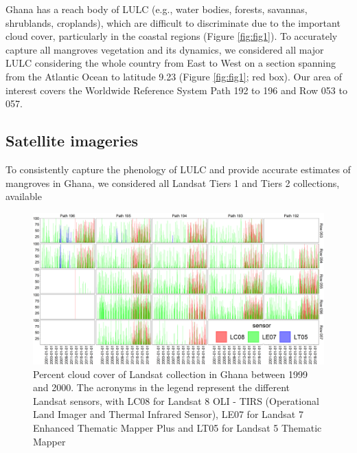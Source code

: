 \documentclass[12pt,oneside,preprint,3p,authoryear,times]{elsarticle} %
\begin{document}
Ghana has a reach body of LULC (e.g., water bodies, forests, savannas,
shrublands, croplands), which are difficult to discriminate due to the
important cloud cover, particularly in the coastal regions (Figure
\ref{fig:fig1}). To accurately capture all mangroves vegetation and its
dynamics, we considered all major LULC considering the whole country
from East to West on a section spanning from the Atlantic Ocean to
latitude 9.23 (Figure \ref{fig:fig1}; red box). Our area of interest
covers the Worldwide Reference System Path 192 to 196 and Row 053 to
057.

\hypertarget{satellite-imageries}{%
\subsection{Satellite imageries}\label{satellite-imageries}}

To consistently capture the phenology of LULC and provide accurate
estimates of mangroves in Ghana, we considered all Landsat Tiers 1 and
Tiers 2 collections, available

\begin{figure}[!htbp]

{\centering \includegraphics[width=1\linewidth,]{figures/pngs/Ghana_CloudScore} 

}

\caption{Percent cloud cover of Landsat collection in Ghana between 1999 and 2000. The acronyms in the legend represent the different Landsat sensors, with LC08 for Landsat 8 OLI - TIRS (Operational Land Imager and Thermal Infrared Sensor), LE07 for Landsat 7 Enhanced Thematic Mapper Plus and LT05 for Landsat 5 Thematic Mapper}\label{fig:fig2}
\end{figure}
\end{document}
